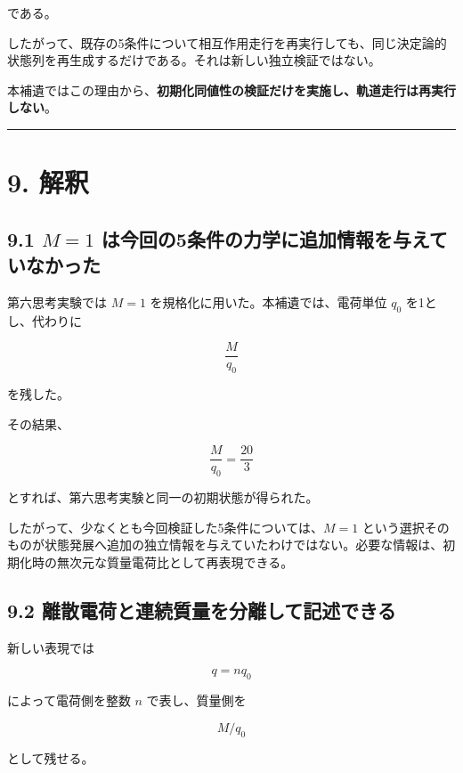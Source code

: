 \documentclass[
  a4paper,
]{ltjsarticle}
\begin{document}
である。

したがって、既存の5条件について相互作用走行を再実行しても、同じ決定論的状態列を再生成するだけである。それは新しい独立検証ではない。

本補遺ではこの理由から、\textbf{初期化同値性の検証だけを実施し、軌道走行は再実行しない}。

\begin{center}\rule{0.5\linewidth}{0.5pt}\end{center}

\section{9. 解釈}\label{ux89e3ux91c8}

\subsection{\texorpdfstring{9.1 \(M=1\)
は今回の5条件の力学に追加情報を与えていなかった}{9.1 M=1 は今回の5条件の力学に追加情報を与えていなかった}}\label{m1-ux306fux4ecaux56deux306e5ux6761ux4ef6ux306eux529bux5b66ux306bux8ffdux52a0ux60c5ux5831ux3092ux4e0eux3048ux3066ux3044ux306aux304bux3063ux305f}

第六思考実験では \(M=1\) を規格化に用いた。本補遺では、電荷単位 \(q_0\)
を1とし、代わりに

\[
\frac{M}{q_0}
\]

を残した。

その結果、

\[
\frac{M}{q_0}=\frac{20}{3}
\]

とすれば、第六思考実験と同一の初期状態が得られた。

したがって、少なくとも今回検証した5条件については、\(M=1\)
という選択そのものが状態発展へ追加の独立情報を与えていたわけではない。必要な情報は、初期化時の無次元な質量電荷比として再表現できる。

\subsection{9.2
離散電荷と連続質量を分離して記述できる}\label{ux96e2ux6563ux96fbux8377ux3068ux9023ux7d9aux8ceaux91cfux3092ux5206ux96e2ux3057ux3066ux8a18ux8ff0ux3067ux304dux308b}

新しい表現では

\[
q=nq_0
\]

によって電荷側を整数 \(n\) で表し、質量側を

\[
M/q_0
\]

として残せる。
\end{document}
